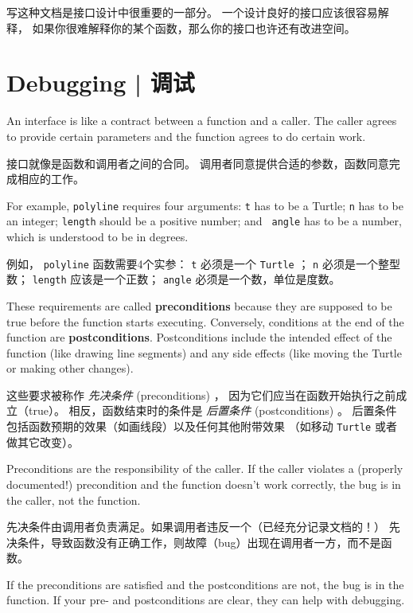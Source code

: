 写这种文档是接口设计中很重要的一部分。 一个设计良好的接口应该很容易解释，
如果你很难解释你的某个函数，那么你的接口也许还有改进空间。


\section{Debugging  |  调试}
  

An interface is like a contract between a function and a caller.
The caller agrees to provide certain parameters and the function
agrees to do certain work.

接口就像是函数和调用者之间的合同。
调用者同意提供合适的参数，函数同意完成相应的工作。

For example, {\tt polyline} requires four arguments: {\tt t} has to be
a Turtle; {\tt n} has to be an
integer; {\tt length} should be a positive number; and {\tt
  angle} has to be a number, which is understood to be in degrees.

例如， \lstinline{polyline} 函数需要4个实参： \lstinline{t} 必须是一个 \lstinline{Turtle} ；
\lstinline{n} 必须是一个整型数； \lstinline{length} 应该是一个正数；
\lstinline{angle} 必须是一个数，单位是度数。

These requirements are called {\bf preconditions} because they
are supposed to be true before the function starts executing.
Conversely, conditions at the end of the function are
{\bf postconditions}.  Postconditions include the intended
effect of the function (like drawing line segments) and any
side effects (like moving the Turtle or making other changes).

这些要求被称作 \emph{先决条件} (preconditions) ，
因为它们应当在函数开始执行之前成立（true）。
相反，函数结束时的条件是 \emph{后置条件} (postconditions) 。
后置条件包括函数预期的效果（如画线段）以及任何其他附带效果
（如移动 \lstinline{Turtle} 或者做其它改变）。
  

Preconditions are the responsibility of the caller.  If the caller
violates a (properly documented!) precondition and the function
doesn't work correctly, the bug is in the caller, not the function.

先决条件由调用者负责满足。如果调用者违反一个（已经充分记录文档的！）
先决条件，导致函数没有正确工作，则故障（bug）出现在调用者一方，而不是函数。

If the preconditions are satisfied and the postconditions are
not, the bug is in the function.  If your pre- and postconditions
are clear, they can help with debugging.

